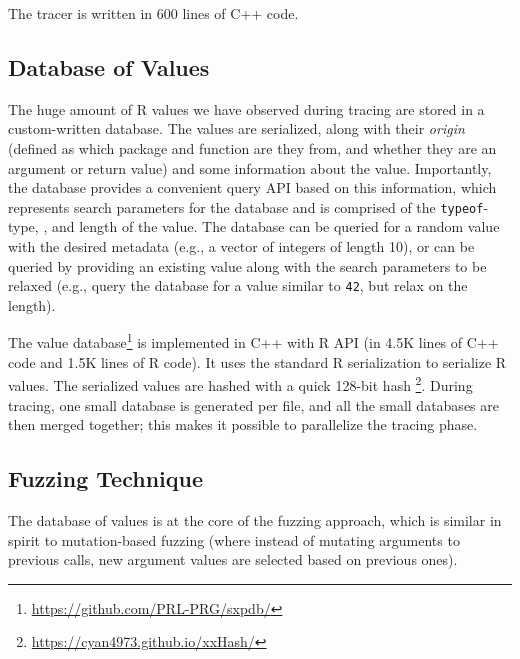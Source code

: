 \documentclass[sigplan,anonymous,review]{acmart}
\begin{document}
The tracer is written in 600 lines of C++ code.


\subsection{Database of Values}

The huge amount of R values we have observed during tracing are stored in a custom-written database. 
The values are serialized, along with their \textit{origin} (defined as which package and function are they from, and whether they are an argument or return value) and some information about the value. %
Importantly, the database provides a convenient query API based on this information, which represents search parameters for the database and is comprised of the {\tt typeof}-type, , and length of the value. 
The database can be queried for a random value with the desired metadata (e.g., a vector of integers of length 10), or can be queried by providing an existing value along with the search parameters to be relaxed (e.g., query the database for a value similar to {\tt 42}, but relax on the length).

The value database\footnote{\url{https://github.com/PRL-PRG/sxpdb/}  } is implemented in C++ with R API (in 4.5K lines of C++ code and 1.5K lines of R code).
It uses the standard R serialization to serialize R values. 
The serialized values are hashed with a quick 128-bit hash \footnote{\url{https://cyan4973.github.io/xxHash/}}. 
During tracing, one small database is generated per file, and all the small databases are then merged together; this makes it possible to parallelize the tracing phase.

\subsection{Fuzzing Technique }

The database of values is at the core of the fuzzing approach, which is similar in spirit to mutation-based fuzzing (where instead of mutating arguments to previous calls, new argument values are selected based on previous ones).
\end{document}
